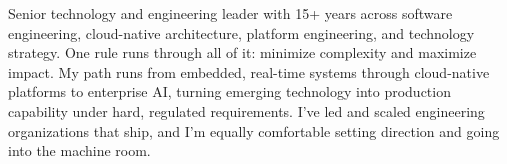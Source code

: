 
\begin{cvparagraph}
Senior technology and engineering leader with 15+ years across software engineering, cloud-native architecture, platform engineering, and technology strategy. One rule runs through all of it: minimize complexity and maximize impact. My path runs from embedded, real-time systems through cloud-native platforms to enterprise AI, turning emerging technology into production capability under hard, regulated requirements. I've led and scaled engineering organizations that ship, and I'm equally comfortable setting direction and going into the machine room.
\end{cvparagraph}
